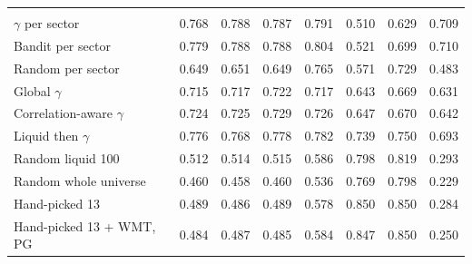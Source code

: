 \begin{table}[H]
\begin{tabular}{l*{7}{r}}
\addlinespace
\multicolumn{8}{l}{\emph{Bear stress, mean portfolio $\beta$}} \\
$\gamma$ per sector & 0.768 & 0.788 & 0.787 & 0.791 & 0.510 & 0.629 & 0.709 \\
Bandit per sector & 0.779 & 0.788 & 0.788 & 0.804 & 0.521 & 0.699 & 0.710 \\
Random per sector & 0.649 & 0.651 & 0.649 & 0.765 & 0.571 & 0.729 & 0.483 \\
\addlinespace[2pt]
Global $\gamma$ & 0.715 & 0.717 & 0.722 & 0.717 & 0.643 & 0.669 & 0.631 \\
Correlation-aware $\gamma$ & 0.724 & 0.725 & 0.729 & 0.726 & 0.647 & 0.670 & 0.642 \\
Liquid then $\gamma$ & 0.776 & 0.768 & 0.778 & 0.782 & 0.739 & 0.750 & 0.693 \\
Random liquid 100 & 0.512 & 0.514 & 0.515 & 0.586 & 0.798 & 0.819 & 0.293 \\
Random whole universe & 0.460 & 0.458 & 0.460 & 0.536 & 0.769 & 0.798 & 0.229 \\
\addlinespace[2pt]
Hand-picked 13 & 0.489 & 0.486 & 0.489 & 0.578 & 0.850 & 0.850 & 0.284 \\
Hand-picked 13 + WMT, PG & 0.484 & 0.487 & 0.485 & 0.584 & 0.847 & 0.850 & 0.250 \\
\bottomrule
\end{tabular}
\end{table}
